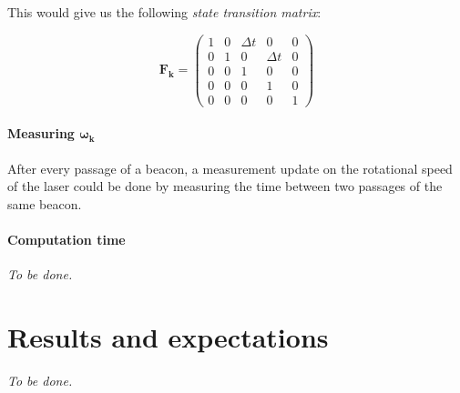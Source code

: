 \documentclass[a4paper, 12pt]{paper}
\begin{document}
This would give us the following \emph{state transition matrix}:

\begin{equation}
    \mathbf{F_k} = \left( \begin{array}{ccccc} 1 & 0 & \Delta t & 0 & 0 \\
                                              0 & 1 & 0 & \Delta t & 0  \\
                                              0 & 0 & 1 & 0 & 0 \\
                                              0 & 0 & 0 & 1 & 0 \\
                                              0 & 0 & 0 & 0 & 1
                                        \end{array} \right)
\label{eq:ekf_state_trans}
\end{equation}

\paragraph{Measuring $\mathbf{\omega_k}$}

After every passage of a beacon, a measurement update on the rotational speed
of the laser could be done by measuring the time between two passages of the
same beacon.

\paragraph{Computation time}
\emph{To be done.}

\section{Results and expectations}

\emph{To be done.}




\end{document}
